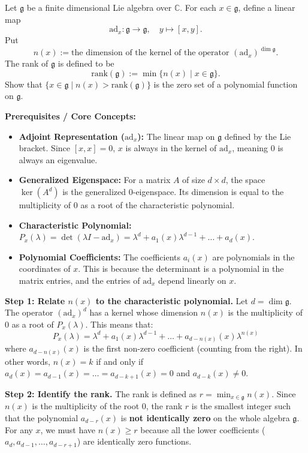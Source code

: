 \begin{exercise}
\label{algebra:2017:8}
Let $\mathfrak{g}$ be a finite dimensional Lie algebra over $\mathbb{C}$. For each $x \in \mathfrak{g}$, define a linear map
\[
\mathrm{ad}_x: \mathfrak{g} \to \mathfrak{g}, \quad y \mapsto [x, y].
\]
Put
\[
n(x) := \text{the dimension of the kernel of the operator } (\mathrm{ad}_x)^{\dim \mathfrak{g}}.
\]
The rank of $\mathfrak{g}$ is defined to be
\[
\mathrm{rank}(\mathfrak{g}) := \min \{n(x) \mid x \in \mathfrak{g}\}.
\]
Show that $\{x \in \mathfrak{g} \mid n(x) > \mathrm{rank}(\mathfrak{g})\}$ is the zero set of a polynomial function on $\mathfrak{g}$.
\end{exercise}
\begin{solution}
\textbf{Prerequisites / Core Concepts:}
\begin{itemize}
    \item \textbf{Adjoint Representation ($\text{ad}_x$):} The linear map on $\mathfrak{g}$ defined by the Lie bracket. Since $[x, x] = 0$, $x$ is always in the kernel of $\text{ad}_x$, meaning $0$ is always an eigenvalue.
    \item \textbf{Generalized Eigenspace:} For a matrix $A$ of size $d \times d$, the space $\ker(A^d)$ is the generalized $0$-eigenspace. Its dimension is equal to the multiplicity of $0$ as a root of the characteristic polynomial.
    \item \textbf{Characteristic Polynomial:} $P_x(\lambda) = \det(\lambda I - \text{ad}_x) = \lambda^d + a_1(x) \lambda^{d-1} + \dots + a_d(x)$.
    \item \textbf{Polynomial Coefficients:} The coefficients $a_i(x)$ are polynomials in the coordinates of $x$. This is because the determinant is a polynomial in the matrix entries, and the entries of $\text{ad}_x$ depend linearly on $x$.
\end{itemize}

\textbf{Step 1: Relate $n(x)$ to the characteristic polynomial.}
Let $d = \dim \mathfrak{g}$. The operator $(\text{ad}_x)^d$ has a kernel whose dimension $n(x)$ is the multiplicity of $0$ as a root of $P_x(\lambda)$.
This means that:
\[ P_x(\lambda) = \lambda^d + a_1(x) \lambda^{d-1} + \dots + a_{d-n(x)}(x) \lambda^{n(x)} \]
where $a_{d-n(x)}(x)$ is the first non-zero coefficient (counting from the right).
In other words, $n(x) = k$ if and only if $a_d(x) = a_{d-1}(x) = \dots = a_{d-k+1}(x) = 0$ and $a_{d-k}(x) \neq 0$.

\textbf{Step 2: Identify the rank.}
The rank is defined as $r = \min_{x \in \mathfrak{g}} n(x)$.
Since $n(x)$ is the multiplicity of the root $0$, the rank $r$ is the smallest integer such that the polynomial $a_{d-r}(x)$ is \textbf{not identically zero} on the whole algebra $\mathfrak{g}$.
For any $x$, we must have $n(x) \geq r$ because all the lower coefficients ($a_d, a_{d-1}, \dots, a_{d-r+1}$) are identically zero functions.


\end{solution}
